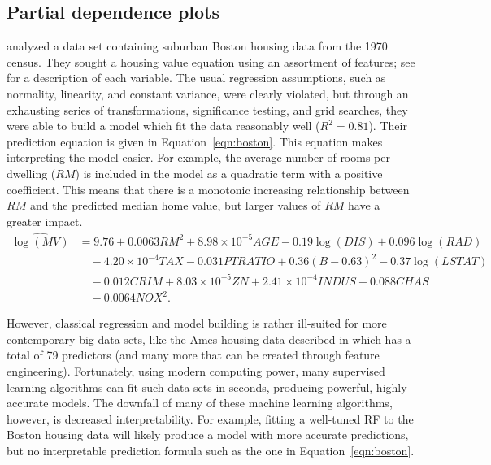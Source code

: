\documentclass[12pt]{article}
\begin{document}
\subsection{Partial dependence plots}

\citet{harrison-1978-hedonic} analyzed a data set containing suburban Boston housing data from the 1970 census. They sought a housing value equation using an assortment of features; see \citet[Table IV]{harrison-1978-hedonic} for a description of each variable. The usual regression assumptions, such as normality, linearity, and constant variance, were clearly violated, but through an exhausting series of transformations, significance testing, and grid searches, they were able to build a model which fit the data reasonably well ($R^2 = 0.81$). Their prediction equation is given in Equation~\eqref{eqn:boston}. This equation makes interpreting the model easier. For example, the average number of rooms per dwelling ($RM$) is included in the model as a quadratic term with a positive coefficient. This means that there is a monotonic increasing relationship between $RM$ and the predicted median home value, but larger values of $RM$ have a greater impact.
\begin{equation}
\label{eqn:boston}
\begin{aligned}
\widehat{\log\left(MV\right)} &= 9.76 + 0.0063 RM^2 + 8.98\times10^{-5} AGE - 0.19\log\left(DIS\right) + 0.096\log\left(RAD\right) \\
  & \quad - 4.20\times10^{-4} TAX - 0.031 PTRATIO + 0.36\left(B - 0.63\right)^2 - 0.37\log\left(LSTAT\right) \\
  & \quad - 0.012 CRIM + 8.03\times10^{-5} ZN + 2.41\times10^{-4} INDUS + 0.088 CHAS \\
  & \quad - 0.0064 NOX^2.
\end{aligned}
\end{equation}

However, classical regression and model building is rather ill-suited for more contemporary big data sets, like the Ames housing data described in \citet{ames-cock-2011} which has a total of 79 predictors (and many more that can be created through feature engineering). Fortunately, using modern computing power, many supervised learning algorithms can fit such data sets in seconds, producing powerful, highly accurate models. The downfall of many of these machine learning algorithms, however, is decreased interpretability. For example, fitting a well-tuned RF to the Boston housing data will likely produce a model with more accurate predictions, but no interpretable prediction formula such as the one in Equation~\eqref{eqn:boston}.
\end{document}
